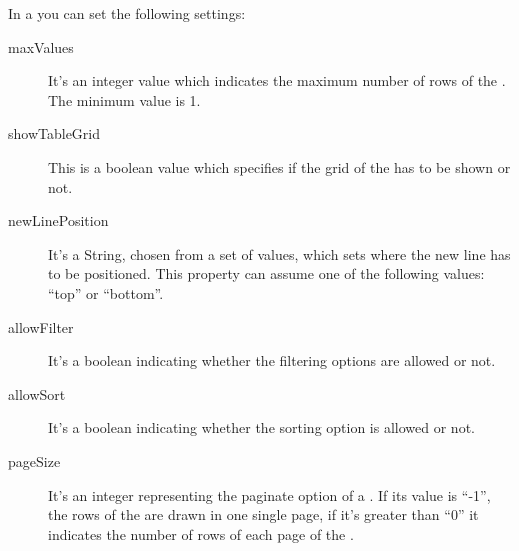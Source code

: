 				In a  you can set the following settings:
				\begin{description}
					\item[maxValues] It's an integer value which indicates the maximum number of rows of the . The minimum value is 1.
					\item[showTableGrid] This is a boolean value which specifies if the grid of the  has to be shown or not.
					\item[newLinePosition] It's a String, chosen from a set of values, which sets where the new line has to be positioned. This property can assume one of the following values: “top” or “bottom”.
					\item[allowFilter] It's a boolean indicating whether the filtering options are allowed or not.
					\item[allowSort] It's a boolean indicating whether the sorting option is allowed or not.
					\item[pageSize] It's an integer representing the paginate option of a . If its value is “-1”, the rows of the  are drawn in one single page, if it's greater than “0” it indicates the number of rows of each page of the .
				\end{description}


